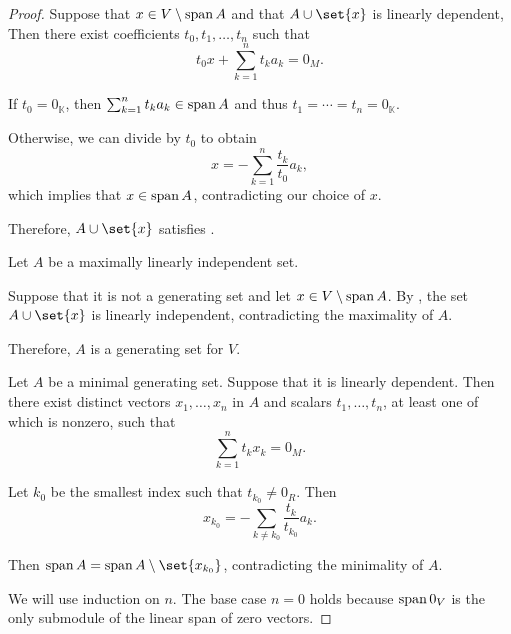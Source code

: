 \begin{proof}
   Suppose that \( x \in V \setminus \operatorname{span} A \) and that \( A \cup \set{ x } \) is linearly dependent, Then there exist coefficients \( t_0, t_1, \ldots, t_n \) such that
  \begin{equation*}
    t_0 x + \sum_{k=1}^n t_k a_k = 0_M.
  \end{equation*}

  If \( t_0 = 0_\BbbK \), then \( \sum_{k=1}^n t_k a_k \in \operatorname{span} A \) and thus \( t_1 = \cdots = t_n = 0_\BbbK \).

  Otherwise, we can divide by \( t_0 \) to obtain
  \begin{equation*}
    x = -\sum_{k=1}^n \frac {t_k} {t_0} a_k,
  \end{equation*}
  which implies that \( x \in \operatorname{span} A \), contradicting our choice of \( x \).

  Therefore, \( A \cup \set{ x } \) satisfies .

   Let \( A \) be a maximally linearly independent set.

  Suppose that it is not a generating set and let \( x \in V \setminus \operatorname{span} A \). By , the set \( A \cup \set{ x } \) is linearly independent, contradicting the maximality of \( A \).

  Therefore, \( A \) is a generating set for \( V \).

   Let \( A \) be a minimal generating set. Suppose that it is linearly dependent. Then there exist distinct vectors \( x_1, \ldots, x_n \) in \( A \) and scalars \( t_1, \ldots, t_n \), at least one of which is nonzero, such that
  \begin{equation*}
    \sum_{k=1}^n t_k x_k = 0_M.
  \end{equation*}

  Let \( k_0 \) be the smallest index such that \( t_{k_0} \neq 0_R \). Then
  \begin{equation*}
    x_{k_0} = -\sum_{k \neq k_0} \frac {t_k} {t_{k_0}} a_k.
  \end{equation*}

  Then \( \linspan A = \linspan A \setminus \set{ x_{k_0} } \), contradicting the minimality of \( A \).

   We will use induction on \( n \). The base case \( n = 0 \) holds because \( \operatorname{span}{ 0_V } \) is the only submodule of the linear span of zero vectors.


\end{proof}
